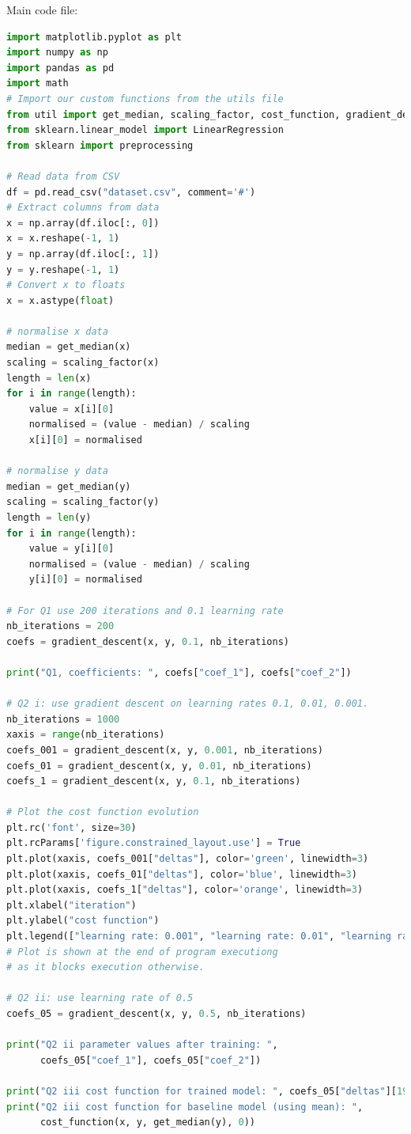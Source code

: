 \documentclass[10pt]{article}
\begin{document}
Main code file:
\begin{lstlisting}[language=Python]
import matplotlib.pyplot as plt
import numpy as np
import pandas as pd
import math
# Import our custom functions from the utils file
from util import get_median, scaling_factor, cost_function, gradient_descent
from sklearn.linear_model import LinearRegression
from sklearn import preprocessing

# Read data from CSV
df = pd.read_csv("dataset.csv", comment='#')
# Extract columns from data
x = np.array(df.iloc[:, 0])
x = x.reshape(-1, 1)
y = np.array(df.iloc[:, 1])
y = y.reshape(-1, 1)
# Convert x to floats
x = x.astype(float)

# normalise x data
median = get_median(x)
scaling = scaling_factor(x)
length = len(x)
for i in range(length):
    value = x[i][0]
    normalised = (value - median) / scaling
    x[i][0] = normalised

# normalise y data
median = get_median(y)
scaling = scaling_factor(y)
length = len(y)
for i in range(length):
    value = y[i][0]
    normalised = (value - median) / scaling
    y[i][0] = normalised

# For Q1 use 200 iterations and 0.1 learning rate
nb_iterations = 200
coefs = gradient_descent(x, y, 0.1, nb_iterations)

print("Q1, coefficients: ", coefs["coef_1"], coefs["coef_2"])

# Q2 i: use gradient descent on learning rates 0.1, 0.01, 0.001.
nb_iterations = 1000
xaxis = range(nb_iterations)
coefs_001 = gradient_descent(x, y, 0.001, nb_iterations)
coefs_01 = gradient_descent(x, y, 0.01, nb_iterations)
coefs_1 = gradient_descent(x, y, 0.1, nb_iterations)

# Plot the cost function evolution
plt.rc('font', size=30)
plt.rcParams['figure.constrained_layout.use'] = True
plt.plot(xaxis, coefs_001["deltas"], color='green', linewidth=3)
plt.plot(xaxis, coefs_01["deltas"], color='blue', linewidth=3)
plt.plot(xaxis, coefs_1["deltas"], color='orange', linewidth=3)
plt.xlabel("iteration")
plt.ylabel("cost function")
plt.legend(["learning rate: 0.001", "learning rate: 0.01", "learning rate: 0.1"])
# Plot is shown at the end of program executiong 
# as it blocks execution otherwise.

# Q2 ii: use learning rate of 0.5
coefs_05 = gradient_descent(x, y, 0.5, nb_iterations)

print("Q2 ii parameter values after training: ",
      coefs_05["coef_1"], coefs_05["coef_2"])

print("Q2 iii cost function for trained model: ", coefs_05["deltas"][199])
print("Q2 iii cost function for baseline model (using mean): ",
      cost_function(x, y, get_median(y), 0))


\end{lstlisting}
\end{document}
